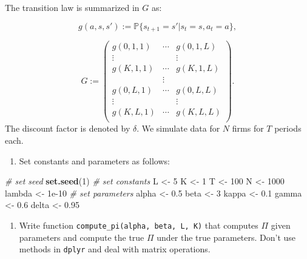 \documentclass[
]{book}
\newenvironment{Shaded}{\begin{snugshade}}{\end{snugshade}}
\newcommand{\CommentTok}[1]{\textcolor[rgb]{0.56,0.35,0.01}{\textit{#1}}}
\newcommand{\DecValTok}[1]{\textcolor[rgb]{0.00,0.00,0.81}{#1}}
\newcommand{\FloatTok}[1]{\textcolor[rgb]{0.00,0.00,0.81}{#1}}
\newcommand{\FunctionTok}[1]{\textcolor[rgb]{0.13,0.29,0.53}{\textbf{#1}}}
\newcommand{\NormalTok}[1]{#1}
\newcommand{\OtherTok}[1]{\textcolor[rgb]{0.56,0.35,0.01}{#1}}
\providecommand{\tightlist}{%
  \setlength{\itemsep}{0pt}\setlength{\parskip}{0pt}}
\begin{document}
The transition law is summarized in \(G\) as:

\[
g(a, s, s') := \mathbb{P}\{s_{t + 1} = s'|s_t = s, a_t = a\},
\]

\[
G := 
\begin{pmatrix}
g(0, 1, 1) & \cdots & g(0, 1, L)\\
\vdots & & \vdots \\
g(K, 1, 1) & \cdots & g(K, 1, L)\\
& \vdots & \\
g(0, L, 1) & \cdots & g(0, L, L)\\
\vdots & & \vdots \\
g(K, L, 1) & \cdots & g(K, L, L)\\
\end{pmatrix}.
\]
The discount factor is denoted by \(\delta\). We simulate data for \(N\) firms for \(T\) periods each.

\begin{enumerate}
\def\labelenumi{\arabic{enumi}.}
\tightlist
\item
  Set constants and parameters as follows:
\end{enumerate}

\begin{Shaded}
\begin{Highlighting}[]
\CommentTok{\# set seed}
\FunctionTok{set.seed}\NormalTok{(}\DecValTok{1}\NormalTok{)}
\CommentTok{\# set constants }
\NormalTok{L }\OtherTok{\textless{}{-}} \DecValTok{5}
\NormalTok{K }\OtherTok{\textless{}{-}} \DecValTok{1}
\NormalTok{T }\OtherTok{\textless{}{-}} \DecValTok{100}
\NormalTok{N }\OtherTok{\textless{}{-}} \DecValTok{1000}
\NormalTok{lambda }\OtherTok{\textless{}{-}} \FloatTok{1e{-}10}
\CommentTok{\# set parameters}
\NormalTok{alpha }\OtherTok{\textless{}{-}} \FloatTok{0.5}
\NormalTok{beta }\OtherTok{\textless{}{-}} \DecValTok{3}
\NormalTok{kappa }\OtherTok{\textless{}{-}} \FloatTok{0.1}
\NormalTok{gamma }\OtherTok{\textless{}{-}} \FloatTok{0.6}
\NormalTok{delta }\OtherTok{\textless{}{-}} \FloatTok{0.95}
\end{Highlighting}
\end{Shaded}

\begin{enumerate}
\def\labelenumi{\arabic{enumi}.}
\setcounter{enumi}{1}
\tightlist
\item
  Write function \texttt{compute\_pi(alpha,\ beta,\ L,\ K)} that computes \(\Pi\) given parameters and compute the true \(\Pi\) under the true parameters. Don't use methods in \texttt{dplyr} and deal with matrix operations.
\end{enumerate}
\end{document}
